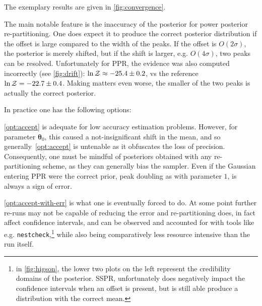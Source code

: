 \documentclass[usenatbib]{mnras}
\begin{document}
The exemplary results are given in \cref{fig:convergence}.

The main notable feature is the inaccuracy of the posterior for
power posterior re-partitioning. One does expect it to produce the
correct posterior distribution if the offset is large compared to
the width of the peaks. If the offset is \(O(2\sigma)\), the
posterior is merely shifted, but if the shift is larger,
e.g. \(O(4\sigma)\), two peaks can be resolved. Unfortunately for
PPR, the evidence was also computed incorrectly (see
\cref{fig:drift}): \(\ln {\cal Z}\approx -25.4 \pm 0.2\), vs the
reference \(\ln {\cal Z} = -22.7 \pm 0.4\).  Making matters even
worse, the smaller of the two peaks is actually the correct
posterior.

In practice one has the following options:
\vref{opt:accept} is adequate for low accuracy estimation
problems. However, for parameter \(\bm{\theta}_{0}\), this caused a
not-insignificant shift in the mean, and so generally~\vref{opt:accept}
is untenable as it obfuscates the loss of precision. Consequently,
one must be mindful of posteriors obtained with any re-partitioning
scheme, as they can generally bias the sampler. Even if the Gaussian
entering PPR were the correct prior, peak doubling as with parameter
\(1\), is always a sign of error.

\vref{opt:accept-with-err} is what one is eventually forced to
do. At some point further re-runs may not be capable of reducing the
error and re-partitioning does, in fact affect confidence intervals,
and can be observed and accounted for with tools like
e.g. \texttt{nestcheck},\footnote{in \cref{fig:higson}, the lower two plots on
the left represent the credibility domains of the posterior. SSPR,
unfortunately does negatively impact the confidence intervals when
an offset is present, but is still able produce a distribution with
the correct mean.} while also being comparatively less resource
intensive than the run itself.
\end{document}
